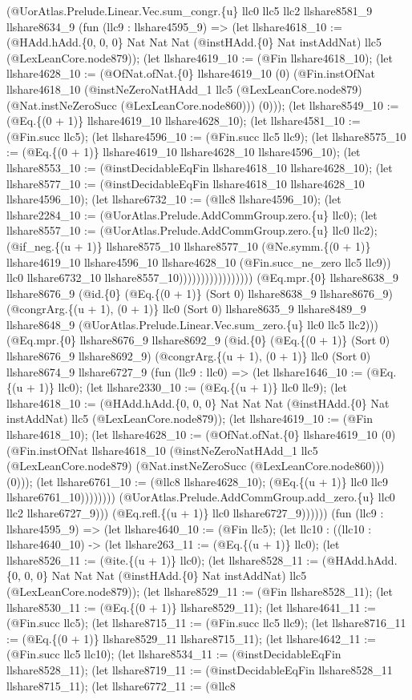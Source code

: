 \documentclass[11pt]{article}
\begin{document}
(@UorAtlas.Prelude.Linear.Vec.sum\_congr.\{u\} llc0 llc5 llc2 llshare8581\_9 llshare8634\_9 (fun (llc9 : llshare4595\_9) => (let llshare4618\_10 := (@HAdd.hAdd.\{0, 0, 0\} Nat Nat Nat (@instHAdd.\{0\} Nat instAddNat) llc5 (@LexLeanCore.node879)); (let llshare4619\_10 := (@Fin llshare4618\_10); (let llshare4628\_10 := (@OfNat.ofNat.\{0\} llshare4619\_10 (0) (@Fin.instOfNat llshare4618\_10 (@instNeZeroNatHAdd\_1 llc5 (@LexLeanCore.node879) (@Nat.instNeZeroSucc (@LexLeanCore.node860))) (0))); (let llshare8549\_10 := (@Eq.\{(0 + 1)\} llshare4619\_10 llshare4628\_10); (let llshare4581\_10 := (@Fin.succ llc5); (let llshare4596\_10 := (@Fin.succ llc5 llc9); (let llshare8575\_10 := (@Eq.\{(0 + 1)\} llshare4619\_10 llshare4628\_10 llshare4596\_10); (let llshare8553\_10 := (@instDecidableEqFin llshare4618\_10 llshare4628\_10); (let llshare8577\_10 := (@instDecidableEqFin llshare4618\_10 llshare4628\_10 llshare4596\_10); (let llshare6732\_10 := (@llc8 llshare4596\_10); (let llshare2284\_10 := (@UorAtlas.Prelude.AddCommGroup.zero.\{u\} llc0); (let llshare8557\_10 := (@UorAtlas.Prelude.AddCommGroup.zero.\{u\} llc0 llc2); (@if\_neg.\{(u + 1)\} llshare8575\_10 llshare8577\_10 (@Ne.symm.\{(0 + 1)\} llshare4619\_10 llshare4596\_10 llshare4628\_10 (@Fin.succ\_ne\_zero llc5 llc9)) llc0 llshare6732\_10 llshare8557\_10))))))))))))))))) (@Eq.mpr.\{0\} llshare8638\_9 llshare8676\_9 (@id.\{0\} (@Eq.\{(0 + 1)\} (Sort 0) llshare8638\_9 llshare8676\_9) (@congrArg.\{(u + 1), (0 + 1)\} llc0 (Sort 0) llshare8635\_9 llshare8489\_9 llshare8648\_9 (@UorAtlas.Prelude.Linear.Vec.sum\_zero.\{u\} llc0 llc5 llc2))) (@Eq.mpr.\{0\} llshare8676\_9 llshare8692\_9 (@id.\{0\} (@Eq.\{(0 + 1)\} (Sort 0) llshare8676\_9 llshare8692\_9) (@congrArg.\{(u + 1), (0 + 1)\} llc0 (Sort 0) llshare8674\_9 llshare6727\_9 (fun (llc9 : llc0) => (let llshare1646\_10 := (@Eq.\{(u + 1)\} llc0); (let llshare2330\_10 := (@Eq.\{(u + 1)\} llc0 llc9); (let llshare4618\_10 := (@HAdd.hAdd.\{0, 0, 0\} Nat Nat Nat (@instHAdd.\{0\} Nat instAddNat) llc5 (@LexLeanCore.node879)); (let llshare4619\_10 := (@Fin llshare4618\_10); (let llshare4628\_10 := (@OfNat.ofNat.\{0\} llshare4619\_10 (0) (@Fin.instOfNat llshare4618\_10 (@instNeZeroNatHAdd\_1 llc5 (@LexLeanCore.node879) (@Nat.instNeZeroSucc (@LexLeanCore.node860))) (0))); (let llshare6761\_10 := (@llc8 llshare4628\_10); (@Eq.\{(u + 1)\} llc0 llc9 llshare6761\_10)))))))) (@UorAtlas.Prelude.AddCommGroup.add\_zero.\{u\} llc0 llc2 llshare6727\_9))) (@Eq.refl.\{(u + 1)\} llc0 llshare6727\_9)))))) (fun (llc9 : llshare4595\_9) => (let llshare4640\_10 := (@Fin llc5); (let llc10 : ((llc10 : llshare4640\_10) -> (let llshare263\_11 := (@Eq.\{(u + 1)\} llc0); (let llshare8526\_11 := (@ite.\{(u + 1)\} llc0); (let llshare8528\_11 := (@HAdd.hAdd.\{0, 0, 0\} Nat Nat Nat (@instHAdd.\{0\} Nat instAddNat) llc5 (@LexLeanCore.node879)); (let llshare8529\_11 := (@Fin llshare8528\_11); (let llshare8530\_11 := (@Eq.\{(0 + 1)\} llshare8529\_11); (let llshare4641\_11 := (@Fin.succ llc5); (let llshare8715\_11 := (@Fin.succ llc5 llc9); (let llshare8716\_11 := (@Eq.\{(0 + 1)\} llshare8529\_11 llshare8715\_11); (let llshare4642\_11 := (@Fin.succ llc5 llc10); (let llshare8534\_11 := (@instDecidableEqFin llshare8528\_11); (let llshare8719\_11 := (@instDecidableEqFin llshare8528\_11 llshare8715\_11); (let llshare6772\_11 := (@llc8 
\end{document}
